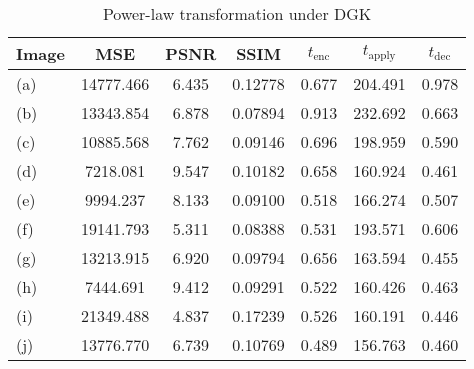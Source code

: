 \begin{table}[h]
	\centering
	\caption{Power-law transformation under DGK}
	\label{tbl:pwr-dgk}
    \begin{tabular}{lcccccc}
        \toprule
        Image & MSE  & PSNR & SSIM & $t_\text{enc}$ & $t_\text{apply}$ & $t_\text{dec}$ \\ \midrule
		(a) & 14777.466 & 6.435 & 0.12778 & 0.677 & 204.491 & 0.978 \\
		(b) & 13343.854 & 6.878 & 0.07894 & 0.913 & 232.692 & 0.663 \\
		(c) & 10885.568 & 7.762 & 0.09146 & 0.696 & 198.959 & 0.590 \\
		(d) & 7218.081 & 9.547 & 0.10182 & 0.658 & 160.924 & 0.461 \\
		(e) & 9994.237 & 8.133 & 0.09100 & 0.518 & 166.274 & 0.507 \\
		(f) & 19141.793 & 5.311 & 0.08388 & 0.531 & 193.571 & 0.606 \\
		(g) & 13213.915 & 6.920 & 0.09794 & 0.656 & 163.594 & 0.455 \\
		(h) & 7444.691 & 9.412 & 0.09291 & 0.522 & 160.426 & 0.463 \\
		(i) & 21349.488 & 4.837 & 0.17239 & 0.526 & 160.191 & 0.446 \\
		(j) & 13776.770 & 6.739 & 0.10769 & 0.489 & 156.763 & 0.460 \\
		\bottomrule
    \end{tabular}
\end{table}
